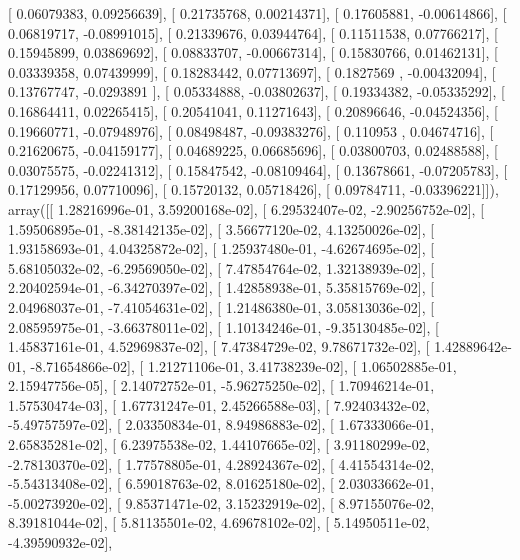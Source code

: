 \documentclass{article}
\begin{document}
       [ 0.06079383,  0.09256639],
       [ 0.21735768,  0.00214371],
       [ 0.17605881, -0.00614866],
       [ 0.06819717, -0.08991015],
       [ 0.21339676,  0.03944764],
       [ 0.11511538,  0.07766217],
       [ 0.15945899,  0.03869692],
       [ 0.08833707, -0.00667314],
       [ 0.15830766,  0.01462131],
       [ 0.03339358,  0.07439999],
       [ 0.18283442,  0.07713697],
       [ 0.1827569 , -0.00432094],
       [ 0.13767747, -0.0293891 ],
       [ 0.05334888, -0.03802637],
       [ 0.19334382, -0.05335292],
       [ 0.16864411,  0.02265415],
       [ 0.20541041,  0.11271643],
       [ 0.20896646, -0.04524356],
       [ 0.19660771, -0.07948976],
       [ 0.08498487, -0.09383276],
       [ 0.110953  ,  0.04674716],
       [ 0.21620675, -0.04159177],
       [ 0.04689225,  0.06685696],
       [ 0.03800703,  0.02488588],
       [ 0.03075575, -0.02241312],
       [ 0.15847542, -0.08109464],
       [ 0.13678661, -0.07205783],
       [ 0.17129956,  0.07710096],
       [ 0.15720132,  0.05718426],
       [ 0.09784711, -0.03396221]]), array([[  1.28216996e-01,   3.59200168e-02],
       [  6.29532407e-02,  -2.90256752e-02],
       [  1.59506895e-01,  -8.38142135e-02],
       [  3.56677120e-02,   4.13250026e-02],
       [  1.93158693e-01,   4.04325872e-02],
       [  1.25937480e-01,  -4.62674695e-02],
       [  5.68105032e-02,  -6.29569050e-02],
       [  7.47854764e-02,   1.32138939e-02],
       [  2.20402594e-01,  -6.34270397e-02],
       [  1.42858938e-01,   5.35815769e-02],
       [  2.04968037e-01,  -7.41054631e-02],
       [  1.21486380e-01,   3.05813036e-02],
       [  2.08595975e-01,  -3.66378011e-02],
       [  1.10134246e-01,  -9.35130485e-02],
       [  1.45837161e-01,   4.52969837e-02],
       [  7.47384729e-02,   9.78671732e-02],
       [  1.42889642e-01,  -8.71654866e-02],
       [  1.21271106e-01,   3.41738239e-02],
       [  1.06502885e-01,   2.15947756e-05],
       [  2.14072752e-01,  -5.96275250e-02],
       [  1.70946214e-01,   1.57530474e-03],
       [  1.67731247e-01,   2.45266588e-03],
       [  7.92403432e-02,  -5.49757597e-02],
       [  2.03350834e-01,   8.94986883e-02],
       [  1.67333066e-01,   2.65835281e-02],
       [  6.23975538e-02,   1.44107665e-02],
       [  3.91180299e-02,  -2.78130370e-02],
       [  1.77578805e-01,   4.28924367e-02],
       [  4.41554314e-02,  -5.54313408e-02],
       [  6.59018763e-02,   8.01625180e-02],
       [  2.03033662e-01,  -5.00273920e-02],
       [  9.85371471e-02,   3.15232919e-02],
       [  8.97155076e-02,   8.39181044e-02],
       [  5.81135501e-02,   4.69678102e-02],
       [  5.14950511e-02,  -4.39590932e-02],
\end{document}
